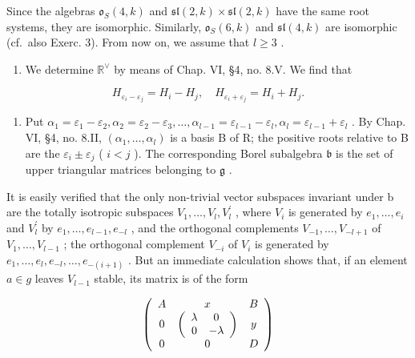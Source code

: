 Since the algebras \(\mathfrak{o}_{S}(4,k)\) and \(\mathfrak{sl}(2,k)\times\mathfrak{sl}(2,k)\) have the same root systems, they are isomorphic. Similarly, \(\mathfrak{o}_{S}(6,k)\) and \(\mathfrak{sl}(4,k)\) are isomorphic (cf.~also Exerc. 3). From now on, we assume that \(l\geq3\) .

\begin{enumerate}
\def\labelenumi{(\Roman{enumi})}
\setcounter{enumi}{1}
\tightlist
\item
  We determine \(\mathbb{R}^{\vee}\) by means of Chap. VI, §4, no. 8.V. We find that
\end{enumerate}

\[
H _ {\varepsilon_ {i} - \varepsilon_ {j}} = H _ {i} - H _ {j}, \quad H _ {\varepsilon_ {i} + \varepsilon_ {j}} = H _ {i} + H _ {j}.
\]

\begin{enumerate}
\def\labelenumi{(\Roman{enumi})}
\setcounter{enumi}{2}
\tightlist
\item
  Put \(\alpha_{1} = \varepsilon_{1} - \varepsilon_{2},\alpha_{2} = \varepsilon_{2} - \varepsilon_{3},\ldots ,\alpha_{l - 1} = \varepsilon_{l - 1} - \varepsilon_{l},\alpha_{l} = \varepsilon_{l - 1} + \varepsilon_{l}\) . By Chap. VI, §4, no. 8.II, \((\alpha_{1},\dots,\alpha_{l})\) is a basis B of R; the positive roots relative to B are the \(\varepsilon_i\pm \varepsilon_j\) ( \(i < j\) ). The corresponding Borel subalgebra \(\mathfrak{b}\) is the set of upper triangular matrices belonging to \(\mathfrak{g}\) .
\end{enumerate}

It is easily verified that the only non-trivial vector subspaces invariant under b are the totally isotropic subspaces \(V_{1},\ldots,V_{l},V_{l}^{\prime}\) , where \(V_{i}\) is generated by \(e_{1},\ldots,e_{i}\) and \(V_{l}^{\prime}\) by \(e_{1},\ldots,e_{l-1},e_{-l}\) , and the orthogonal complements \(V_{-1},\ldots,V_{-l+1}\) of \(V_{1},\ldots,V_{l-1}\) ; the orthogonal complement \(V_{-i}\) of \(V_{i}\) is generated by \(e_{1},\ldots,e_{l},e_{-l},\ldots,e_{-(i+1)}\) . But an immediate calculation shows that, if an element \(a\in g\) leaves \(V_{l-1}\) stable, its matrix is of the form

\[
\left( \begin{array}{c c c} A & x & B \\ 0 & \left( \begin{array}{c c} \lambda & 0 \\ 0 & - \lambda \end{array} \right) & y \\ 0 & 0 & D \end{array} \right)
\]

